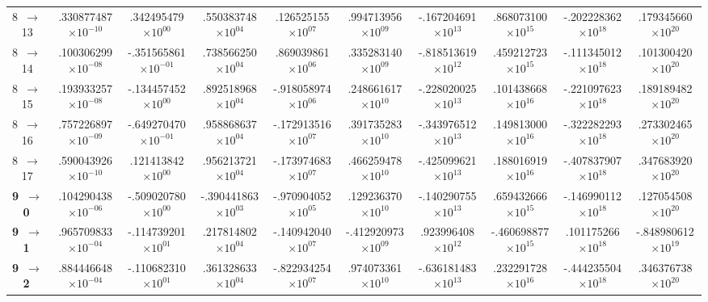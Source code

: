 \documentclass[reviewcopy]{elsarticle}
\begin{document}
\begin{landscape}
\begin{longtable}{lccccccccc}
 8~$\to$~ 13 &  .330877487$\times10^{-10}$ &   .342495479$\times10^{ 00}$ &   .550383748$\times10^{ 04}$ &   .126525155$\times10^{ 07}$ &   .994713956$\times10^{ 09}$ &  -.167204691$\times10^{ 13}$ &   .868073100$\times10^{ 15}$ &  -.202228362$\times10^{ 18}$ &   .179345660$\times10^{ 20}$ \\
 8~$\to$~ 14 &  .100306299$\times10^{-08}$ &  -.351565861$\times10^{-01}$ &   .738566250$\times10^{ 04}$ &   .869039861$\times10^{ 06}$ &   .335283140$\times10^{ 09}$ &  -.818513619$\times10^{ 12}$ &   .459212723$\times10^{ 15}$ &  -.111345012$\times10^{ 18}$ &   .101300420$\times10^{ 20}$ \\
 8~$\to$~ 15 &  .193933257$\times10^{-08}$ &  -.134457452$\times10^{ 00}$ &   .892518968$\times10^{ 04}$ &  -.918058974$\times10^{ 06}$ &   .248661617$\times10^{ 10}$ &  -.228020025$\times10^{ 13}$ &   .101438668$\times10^{ 16}$ &  -.221097623$\times10^{ 18}$ &   .189189482$\times10^{ 20}$ \\
 8~$\to$~ 16 &  .757226897$\times10^{-09}$ &  -.649270470$\times10^{-01}$ &   .958868637$\times10^{ 04}$ &  -.172913516$\times10^{ 07}$ &   .391735283$\times10^{ 10}$ &  -.343976512$\times10^{ 13}$ &   .149813000$\times10^{ 16}$ &  -.322282293$\times10^{ 18}$ &   .273302465$\times10^{ 20}$ \\
 8~$\to$~ 17 &  .590043926$\times10^{-10}$ &   .121413842$\times10^{ 00}$ &   .956213721$\times10^{ 04}$ &  -.173974683$\times10^{ 07}$ &   .466259478$\times10^{ 10}$ &  -.425099621$\times10^{ 13}$ &   .188016919$\times10^{ 16}$ &  -.407837907$\times10^{ 18}$ &   .347683920$\times10^{ 20}$ \\[7pt]
{\bf 9~$\to$~ 0}  &  .104290438$\times10^{-06}$ &  -.509020780$\times10^{ 00}$ &  -.390441863$\times10^{ 03}$ &  -.970904052$\times10^{ 05}$ &   .129236370$\times10^{ 10}$ &  -.140290755$\times10^{ 13}$ &   .659432666$\times10^{ 15}$ &  -.146990112$\times10^{ 18}$ &   .127054508$\times10^{ 20}$ \\
{\bf 9~$\to$~ 1}  &  .965709833$\times10^{-04}$ &  -.114739201$\times10^{ 01}$ &   .217814802$\times10^{ 04}$ &  -.140942040$\times10^{ 07}$ &  -.412920973$\times10^{ 09}$ &   .923996408$\times10^{ 12}$ &  -.460698877$\times10^{ 15}$ &   .101175266$\times10^{ 18}$ &  -.848980612$\times10^{ 19}$ \\
{\bf 9~$\to$~ 2}  &  .884446648$\times10^{-04}$ &  -.110682310$\times10^{ 01}$ &   .361328633$\times10^{ 04}$ &  -.822934254$\times10^{ 07}$ &   .974073361$\times10^{ 10}$ &  -.636181483$\times10^{ 13}$ &   .232291728$\times10^{ 16}$ &  -.444235504$\times10^{ 18}$ &   .346376738$\times10^{ 20}$ \\

\end{longtable}
\end{landscape}
\end{document}

